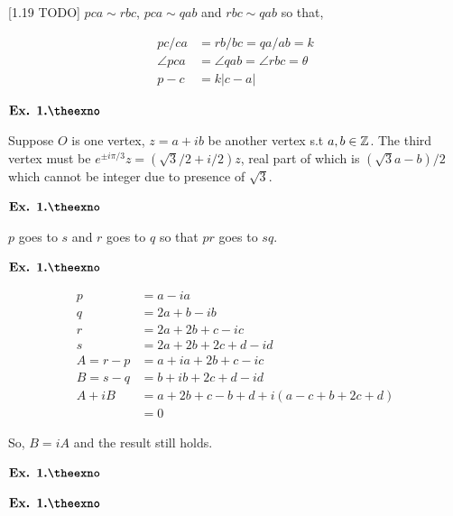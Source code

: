 \documentclass{article}
\def\mb{\ensuremath\mathbb}
\def\Z{\ensuremath\mb{Z}}
\newcounter{exno}
\begin{document}
[1.19 TODO]
$pca \sim rbc$, $pca \sim qab$ and $rbc \sim qab$ so that,

\begin{align*}
    pc/ca &= rb/bc = qa/ab = k\\
    \angle pca &= \angle qab = \angle rbc = \theta\\
    p-c &= k|c-a|
\end{align*}

\vspace{0.2in}

${\textbf{Ex. 1.\theexno}}$
\addtocounter{exno}{1}

Suppose $O$ is one vertex, $z=a+ib$ be another vertex s.t $a,b \in \Z$. The third vertex must be $e^{\pm i\pi/3}z = (\sqrt{3}/2+i/2)z$, real part of which is $(\sqrt{3}a-b)/2$ which cannot be integer due to presence of $\sqrt{3}$.

\vspace{0.2in}

${\textbf{Ex. 1.\theexno}}$
\addtocounter{exno}{1}

$p$ goes to $s$ and $r$ goes to $q$ so that $pr$ goes to $sq$.

\vspace{0.2in}

${\textbf{Ex. 1.\theexno}}$
\addtocounter{exno}{1}

\begin{align*}
    p &= a-ia\\
    q &= 2a + b -ib\\
    r &= 2a + 2b + c -ic\\
    s &= 2a + 2b + 2c + d -id\\
    A = r-p &= a+ia + 2b + c-ic\\
    B = s-q &= b+ib + 2c + d-id\\
    A+iB &= a+2b+c-b+d + i(a-c+b+2c+d)\\
    &= 0
\end{align*}

So, $B=iA$ and the result still holds.

\vspace{0.2in}

${\textbf{Ex. 1.\theexno}}$
\addtocounter{exno}{1}

\vspace{0.2in}

${\textbf{Ex. 1.\theexno}}$
\addtocounter{exno}{1}
\end{document}
